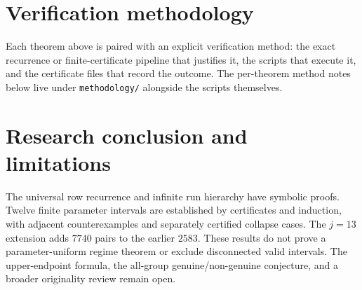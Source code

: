 \documentclass[11pt]{article}
\begin{document}
\section{Verification methodology}\label{sec:methodology}
Each theorem above is paired with an explicit verification method: the exact recurrence or finite-certificate pipeline that justifies it, the scripts that execute it, and the certificate files that record the outcome. The per-theorem method notes below live under \texttt{methodology/} alongside the scripts themselves.



\section{Research conclusion and limitations}
The universal row recurrence and infinite run hierarchy have symbolic proofs. Twelve finite parameter intervals are established by certificates and induction, with adjacent counterexamples and separately certified collapse cases. The $j=13$ extension adds $7740$ pairs to the earlier $2583$. These results do not prove a parameter-uniform regime theorem or exclude disconnected valid intervals. The upper-endpoint formula, the all-group genuine/non-genuine conjecture, and a broader originality review remain open.

\end{document}
